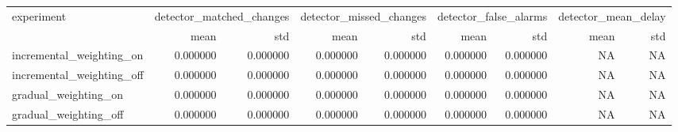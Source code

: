 \begin{tabular}{lrrrrrrrr}
\toprule
experiment & \multicolumn{2}{r}{detector\_matched\_changes} & \multicolumn{2}{r}{detector\_missed\_changes} & \multicolumn{2}{r}{detector\_false\_alarms} & \multicolumn{2}{r}{detector\_mean\_delay} \\
 & mean & std & mean & std & mean & std & mean & std \\
\midrule
incremental\_weighting\_on & 0.000000 & 0.000000 & 0.000000 & 0.000000 & 0.000000 & 0.000000 & NA & NA \\
incremental\_weighting\_off & 0.000000 & 0.000000 & 0.000000 & 0.000000 & 0.000000 & 0.000000 & NA & NA \\
gradual\_weighting\_on & 0.000000 & 0.000000 & 0.000000 & 0.000000 & 0.000000 & 0.000000 & NA & NA \\
gradual\_weighting\_off & 0.000000 & 0.000000 & 0.000000 & 0.000000 & 0.000000 & 0.000000 & NA & NA \\
\bottomrule
\end{tabular}

